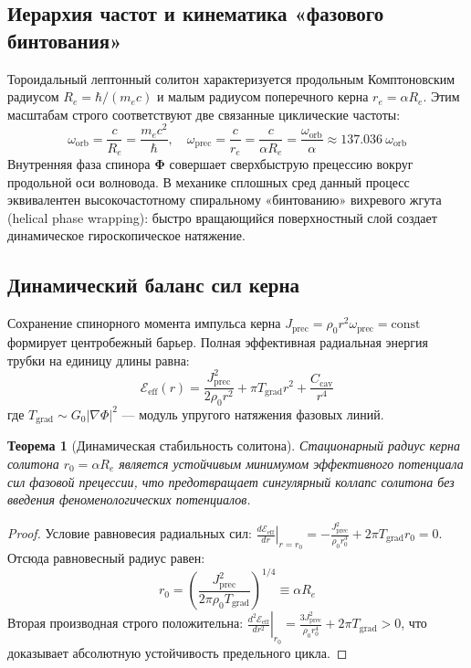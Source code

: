 \documentclass[12pt,a4paper]{article}
\newtheorem{theorem}{Теорема}
\begin{document}
	\subsection{Иерархия частот и кинематика «фазового бинтования»}
	Тороидальный лептонный солитон характеризуется продольным Комптоновским радиусом $R_e = \hbar / (m_e c)$ и малым радиусом поперечного керна $r_e = \alpha R_e$. Этим масштабам строго соответствуют две связанные циклические частоты:
	\begin{equation}
		\omega_{\text{orb}} = \frac{c}{R_e} = \frac{m_e c^2}{\hbar}, \quad \omega_{\text{prec}} = \frac{c}{r_e} = \frac{c}{\alpha R_e} = \frac{\omega_{\text{orb}}}{\alpha} \approx 137.036 \ \omega_{\text{orb}}
	\end{equation}
	Внутренняя фаза спинора $\boldsymbol{\Phi}$ совершает сверхбыструю прецессию вокруг продольной оси волновода. В механике сплошных сред данный процесс эквивалентен высокочастотному спиральному «бинтованию» вихревого жгута (helical phase wrapping): быстро вращающийся поверхностный слой создает динамическое гироскопическое натяжение.
	
	\subsection{Динамический баланс сил керна}
	Сохранение спинорного момента импульса керна $J_{\text{prec}} = \rho_0 r^2 \omega_{\text{prec}} = \text{const}$ формирует центробежный барьер. Полная эффективная радиальная энергия трубки на единицу длины равна:
	\begin{equation}
		\mathcal{E}_{\text{eff}}(r) = \frac{J_{\text{prec}}^2}{2 \rho_0 r^2} + \pi T_{\text{grad}} r^2 + \frac{C_{\text{cav}}}{r^4}
	\end{equation}
	где $T_{\text{grad}} \sim G_0 |\nabla \Phi|^2$ — модуль упругого натяжения фазовых линий.
	
	\begin{theorem}[Динамическая стабильность солитона]
		Стационарный радиус керна солитона $r_0 = \alpha R_e$ является устойчивым минимумом эффективного потенциала сил фазовой прецессии, что предотвращает сингулярный коллапс солитона без введения феноменологических потенциалов.
	\end{theorem}
	
	\begin{proof}
		Условие равновесия радиальных сил: $\left. \frac{d\mathcal{E}_{\text{eff}}}{dr} \right|_{r=r_0} = -\frac{J_{\text{prec}}^2}{\rho_0 r_0^3} + 2\pi T_{\text{grad}} r_0 = 0$. Отсюда равновесный радиус равен:
		\begin{equation}
			r_0 = \left( \frac{J_{\text{prec}}^2}{2\pi \rho_0 T_{\text{grad}}} \right)^{1/4} \equiv \alpha R_e
		\end{equation}
		Вторая производная строго положительна: $\left. \frac{d^2\mathcal{E}_{\text{eff}}}{dr^2} \right|_{r_0} = \frac{3 J_{\text{prec}}^2}{\rho_0 r_0^4} + 2\pi T_{\text{grad}} > 0$, что доказывает абсолютную устойчивость предельного цикла.
	\end{proof}
	
\end{document}
